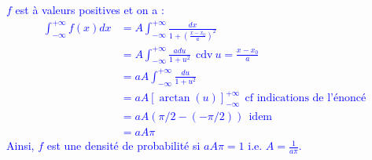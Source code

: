\documentclass[a4paper,12pt]{article}
\begin{document}
\textcolor{blue}{
$f$ est à valeurs positives et on a :
\begin{align*}
\int_{-\infty}^{+\infty} f(x) dx & =A \int_{-\infty}^{+\infty} \frac{dx}{1 + \left( \frac{x-x_0}{a} \right)^2 } \\
& = A \int_{-\infty}^{+\infty} \frac{a du}{1+u^2} \ \ \text{cdv} \ u= \frac{x-x_0}{a} \\
& = aA \int_{-\infty}^{+\infty} \frac{du}{1+u^2} \\
&= aA [\arctan(u)]_{-\infty}^{+\infty} \ \ \text{cf indications de l'énoncé} \\
& = aA (\pi/2 - (-\pi/2)) \ \ \text{idem} \\
&\boxed{ = aA \pi}
\end{align*}
Ainsi, $f$ est une densité de probabilité si $aA \pi = 1$ i.e. $A = \frac{1}{a \pi}$.
}
\end{document}
